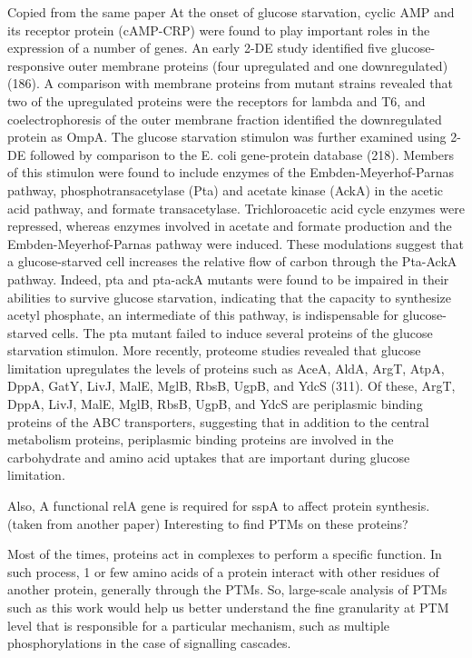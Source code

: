 \documentclass[12pt]{article}
\begin{document}
Copied from the same paper At the onset of glucose starvation, cyclic AMP and its receptor protein (cAMP-CRP) were found to play important roles in the expression of a number of genes. An early 2-DE study identified five glucose-responsive outer membrane proteins (four upregulated and one downregulated) (186). A comparison with membrane proteins from mutant strains revealed that two of the upregulated proteins were the receptors for lambda and T6, and coelectrophoresis of the outer membrane fraction identified the downregulated protein as OmpA. The glucose starvation stimulon was further examined using 2-DE followed by comparison to the E. coli gene-protein database (218). Members of this stimulon were found to include enzymes of the Embden-Meyerhof-Parnas pathway, phosphotransacetylase (Pta) and acetate kinase (AckA) in the acetic acid pathway, and formate transacetylase. Trichloroacetic acid cycle enzymes were repressed, whereas enzymes involved in acetate and formate production and the Embden-Meyerhof-Parnas pathway were induced. These modulations suggest that a glucose-starved cell increases the relative flow of carbon through the Pta-AckA pathway. Indeed, pta and pta-ackA mutants were found to be impaired in their abilities to survive glucose starvation, indicating that the capacity to synthesize acetyl phosphate, an intermediate of this pathway, is indispensable for glucose-starved cells. The pta mutant failed to induce several proteins of the glucose starvation stimulon. More recently, proteome studies revealed that glucose limitation upregulates the levels of proteins such as AceA, AldA, ArgT, AtpA, DppA, GatY, LivJ, MalE, MglB, RbsB, UgpB, and YdcS (311). Of these, ArgT, DppA, LivJ, MalE, MglB, RbsB, UgpB, and YdcS are periplasmic binding proteins of the ABC transporters, suggesting that in addition to the central metabolism proteins, periplasmic binding proteins are involved in the carbohydrate and amino acid uptakes that are important during glucose limitation.

Also, A functional relA gene is required for sspA to affect protein synthesis. (taken from another paper)
Interesting to find PTMs on these proteins?

Most of the times, proteins act in complexes to perform a specific function. In such process, 1 or few amino acids of a protein interact with other residues of another protein, generally through the PTMs. So, large-scale analysis of PTMs such as this work would help us better understand the fine granularity at PTM level that is responsible for a particular mechanism, such as multiple phosphorylations in the case of signalling cascades.
\end{document}
